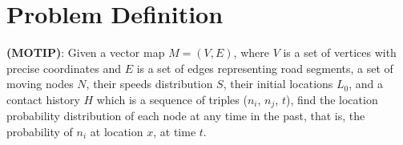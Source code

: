 \section{Problem Definition}

%
 {\bf (MOTIP)}: 
Given a vector map $M = (V, E)$, where $V$ is a set of vertices with precise
coordinates and $E$ is a set of edges representing road segments, 
a set of moving nodes $N$, their speeds distribution $S$, 
their initial locations $L_0$, 
and a contact history $H$ which is a sequence of triples ($n_i$, $n_j$, $t$),
find the location probability distribution of each node at any time in the past,
that is, the probability of $n_i$ at location $x$, at time $t$.

